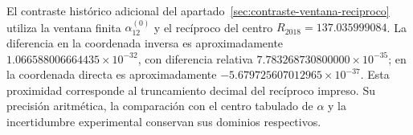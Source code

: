 El contraste histórico adicional del
apartado~\ref{sec:contraste-ventana-reciproco} utiliza la ventana finita
\(\alpha_{12}^{(0)}\) y el recíproco del centro
\(R_{2018}=137.035999084\). La diferencia en la coordenada inversa es
aproximadamente \(1.066588006664435\times10^{-32}\), con diferencia
relativa \(7.783268730800000\times10^{-35}\); en la coordenada directa
es aproximadamente \(-5.679725607012965\times10^{-37}\).
Esta proximidad corresponde al truncamiento decimal del recíproco
impreso. Su precisión aritmética, la comparación con el centro tabulado
de \(\alpha\) y la incertidumbre experimental conservan sus dominios
respectivos.
